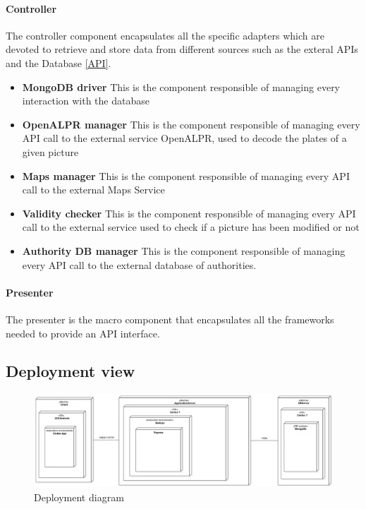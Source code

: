 \paragraph{Controller}
The controller component encapsulates all the specific adapters which are devoted to retrieve and store data from different sources such as the exteral APIs and the Database \ref{API}.
\begin{itemize}
  \item \textbf{MongoDB driver} This is the component responsible of managing every interaction with the database
  \item \textbf{OpenALPR manager} This is the component responsible of managing every API call to the external service OpenALPR, used to decode the plates of a given picture
  \item \textbf{Maps manager} This is the component responsible of managing every API call to the external Maps Service
  \item \textbf{Validity checker} This is the component responsible of managing every API call to the external service used to check if a picture has been modified or not
  \item \textbf{Authority DB manager} This is the component responsible of managing every API call to the external database of authorities.
\end{itemize}


\paragraph{Presenter}
The presenter is the macro component that encapsulates all the frameworks needed to provide an API interface.

\subsection{Deployment view} \label{deploysect}
\begin{figure}[H]
\centering
\includegraphics[width=\textwidth]{Images/DeploymentDiagram1.png}
\caption{\label{fig:deploy} Deployment diagram}
\end{figure}

